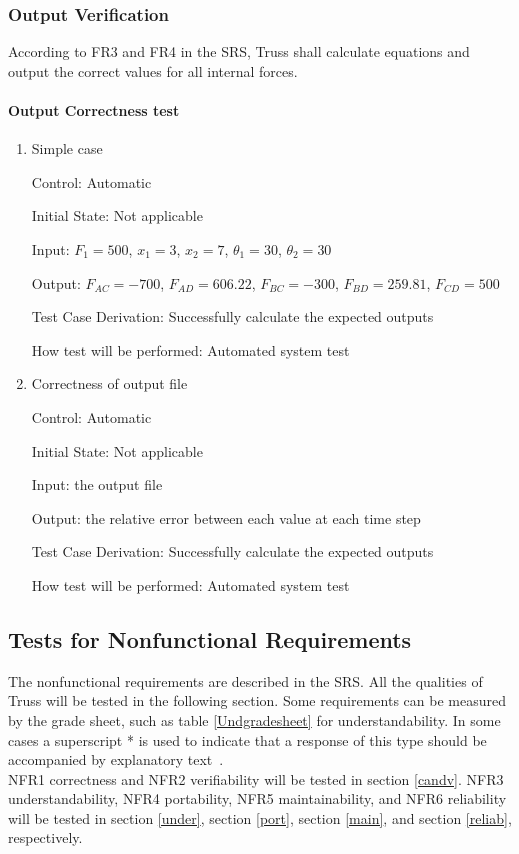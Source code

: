 \documentclass[12pt, titlepage]{article}
\begin{document}
\subsubsection{Output Verification} \label{outverify}
According to FR3 and FR4 in the SRS, Truss shall calculate equations and output 
the correct values for all internal forces. 

\paragraph{Output Correctness test}

\begin{enumerate}
	
	\item{Simple case\\}
	
	Control: Automatic
	
	Initial State: Not applicable
	
	Input: $F_1 = 500$, $x_1 = 3$, $x_2 = 7$, $\theta_1 = 30$, $\theta_2 = 30$
	
	Output: $F_{AC} = -700$, $F_{AD} = 606.22$, $F_{BC} = -300$, $F_{BD} = 
	259.81$, $F_{CD} = 500$
	
	Test Case Derivation: Successfully calculate the expected outputs
	
	How test will be performed: Automated system test
	
	\item{Correctness of output file\\}
	
	Control: Automatic
	
	Initial State: Not applicable
	
	Input: the output file
	
	Output: the relative error between each value at each time step
	
	Test Case Derivation: Successfully calculate the expected outputs
	
	How test will be performed: Automated system test
\end{enumerate}

\subsection{Tests for Nonfunctional Requirements} \label{testnfr}
The nonfunctional requirements are described in the SRS. All the qualities of 
Truss will be tested in the following section. Some requirements can be 
measured by the grade sheet, such as table \ref{Undgradesheet} for 
understandability. In some cases a superscript * is used to indicate 
that a response of this type should be accompanied by explanatory 
text~\cite{Smithetal2018}.\\
NFR1 correctness and NFR2 verifiability will be tested in section \ref{candv}. 
NFR3 understandability, NFR4 portability, NFR5 maintainability, and NFR6 
reliability will be tested in section \ref{under}, section \ref{port}, section 
\ref{main}, and section \ref{reliab}, respectively.
\end{document}
